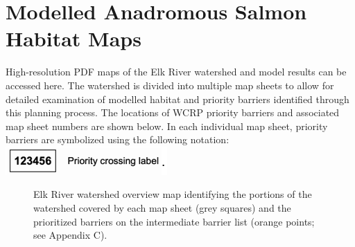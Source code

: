 \documentclass[
  letterpaper,
  DIV=11,
  numbers=noendperiod]{scrreprt}
\begin{document}

\section*{Modelled Anadromous Salmon Habitat
Maps}\label{modelled-anadromous-salmon-habitat-maps}


High-resolution PDF maps of the Elk River watershed and model results
can be accessed here. The watershed is divided into multiple map sheets
to allow for detailed examination of modelled habitat and priority
barriers identified through this planning process. The locations of WCRP
priority barriers and associated map sheet numbers are shown below. In
each individual map sheet, priority barriers are symbolized using the
following notation:
\includegraphics{content/images/priority-crossing-label.png}

\begin{figure}


\caption{\label{fig-over}Elk River watershed overview map identifying
the portions of the watershed covered by each map sheet (grey squares)
and the prioritized barriers on the intermediate barrier list (orange
points; see Appendix C).}

\end{figure}%
\end{document}

